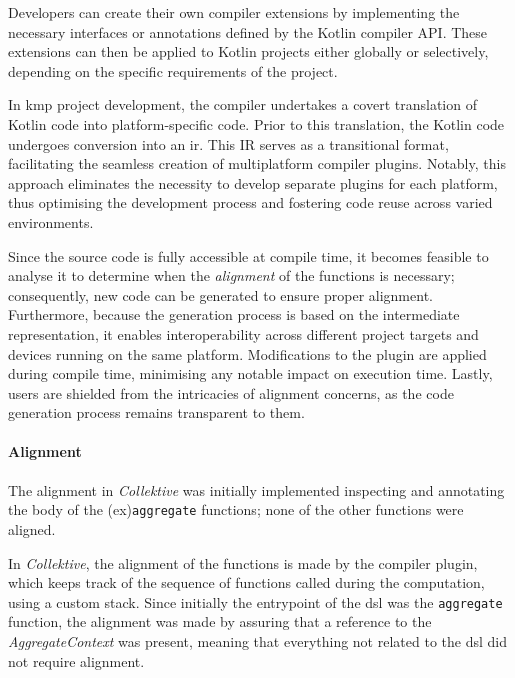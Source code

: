 Developers can create their own compiler extensions by implementing the necessary interfaces or annotations defined by
the Kotlin compiler API.
These extensions can then be applied to Kotlin projects either globally or selectively, depending on the specific
requirements of the project.

In \ac{kmp} project development, the compiler undertakes a covert translation of Kotlin code into platform-specific code.
Prior to this translation, the Kotlin code undergoes conversion into an \ac{ir}.
This IR serves as a transitional format, facilitating the seamless creation of multiplatform compiler plugins.
Notably, this approach eliminates the necessity to develop separate plugins for each platform, thus optimising the
development process and fostering code reuse across varied environments.

Since the source code is fully accessible at compile time, it becomes feasible to analyse it to determine when the \emph{alignment}
of the functions is necessary; consequently, new code can be generated to ensure proper alignment.
Furthermore, because the generation process is based on the intermediate representation, it enables interoperability across
different project targets and devices running on the same platform.
Modifications to the plugin are applied during compile time, minimising any notable impact on execution time.
Lastly, users are shielded from the intricacies of alignment concerns, as the code generation process remains transparent to them.


\paragraph{Alignment}
\label{par:alignment}

The alignment in \emph{Collektive} was initially implemented inspecting and annotating the body of the (ex)\texttt{aggregate} functions;
none of the other functions were aligned.

In \emph{Collektive}, the alignment of the functions is made by the compiler plugin, which keeps track of the sequence of
functions called during the computation, using a custom stack.
Since initially the entrypoint of the \ac{dsl} was the \texttt{aggregate} function, the alignment was made by assuring
that a reference to the \emph{AggregateContext} was present, meaning that everything not related to the \ac{dsl} did not
require alignment.

